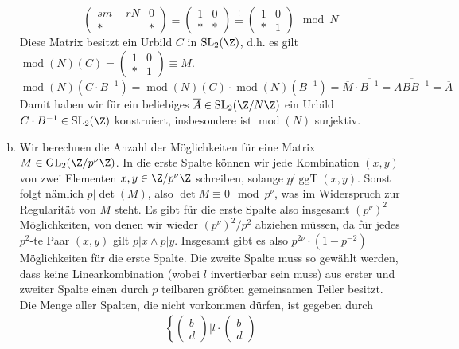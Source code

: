 \documentclass{article}
\newcommand{\ggT}{\operatorname{ggT}}
\begin{document}
\begin{enumerate}[(a)]
\[\begin{pmatrix}
            sm + rN & 0\\
            * & * 
        \end{pmatrix} \equiv \begin{pmatrix}
            1 & 0\\
            * & * 
        \end{pmatrix} \overset{!}{\equiv} \begin{pmatrix}
            1 & 0\\
            * & 1
        \end{pmatrix} \mod N
    \]
    Diese Matrix besitzt ein Urbild $C$ in $\operatorname{SL}_2(\Z)$, d.h. es gilt $\operatorname{mod}(N)(C) = \begin{pmatrix}
        1 & 0\\
        * & 1
    \end{pmatrix} \equiv M$.
    $$\operatorname{mod}(N)(C \cdot B^{-1}) = \operatorname{mod}(N)(C) \cdot \operatorname{mod}(N)(B^{-1}) = \overline{M} \cdot \overline{B^{-1}} = \overline{ABB^{-1}} = \overline{A}$$
    Damit haben wir für ein beliebiges $\overline{A} \in \operatorname{SL}_2(\Z/N\Z)$ ein Urbild $C \cdot B^{-1} \in \operatorname{SL}_2(\Z)$ konstruiert, insbesondere ist $\operatorname{mod}(N)$ surjektiv.
    \item Wir berechnen die Anzahl der Möglichkeiten für eine Matrix $M \in \operatorname{GL}_2(\Z/p^\nu\Z)$.
    In die erste Spalte können wir jede Kombination $(x,y)$ von zwei Elementen $x,y \in \Z/p^\nu\Z$ schreiben, solange $p \not | \ggT(x,y)$. Sonst folgt nämlich $p | \det(M)$, also $\det M \equiv 0 \mod p^\nu$, was im Widerspruch zur Regularität von $M$ steht.
    Es gibt für die erste Spalte also insgesamt $(p^\nu)^2$ Möglichkeiten, von denen wir wieder $(p^\nu)^2/p^2$ abziehen müssen, da für jedes $p^2$-te Paar $(x,y)$ gilt $p | x \land p | y$.
    Insgesamt gibt es also $p^{2\nu} \cdot (1 - p^{-2})$ Möglichkeiten für die erste Spalte.
    Die zweite Spalte muss so gewählt werden, dass keine Linearkombination (wobei $l$ invertierbar sein muss) aus erster und zweiter Spalte einen durch $p$ teilbaren größten gemeinsamen Teiler besitzt.
    Die Menge aller Spalten, die nicht vorkommen dürfen, ist gegeben durch
    \begin{align*}
        \left\{\begin{pmatrix}
            b\\d
        \end{pmatrix} \big| l \cdot \begin{pmatrix}
            b\\d

\end{pmatrix}
\end{align*}
\end{enumerate}
\end{document}
